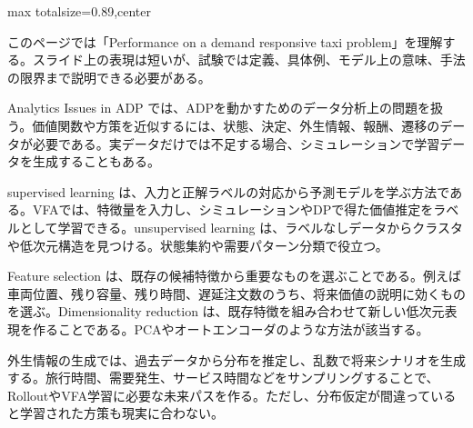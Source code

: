 \begin{minipage}[t]{0.58\textwidth}
\begin{adjustbox}{max totalsize={\textwidth}{0.89\textheight},center}
\begin{minipage}{\textwidth}\scriptsize
{}このページでは「Performance on a demand responsive taxi problem」を理解する。スライド上の表現は短いが、試験では定義、具体例、モデル上の意味、手法の限界まで説明できる必要がある。\par
Analytics Issues in ADP では、ADPを動かすためのデータ分析上の問題を扱う。価値関数や方策を近似するには、状態、決定、外生情報、報酬、遷移のデータが必要である。実データだけでは不足する場合、シミュレーションで学習データを生成することもある。\par
supervised learning は、入力と正解ラベルの対応から予測モデルを学ぶ方法である。VFAでは、特徴量を入力し、シミュレーションやDPで得た価値推定をラベルとして学習できる。unsupervised learning は、ラベルなしデータからクラスタや低次元構造を見つける。状態集約や需要パターン分類で役立つ。\par
Feature selection は、既存の候補特徴から重要なものを選ぶことである。例えば車両位置、残り容量、残り時間、遅延注文数のうち、将来価値の説明に効くものを選ぶ。Dimensionality reduction は、既存特徴を組み合わせて新しい低次元表現を作ることである。PCAやオートエンコーダのような方法が該当する。\par
外生情報の生成では、過去データから分布を推定し、乱数で将来シナリオを生成する。旅行時間、需要発生、サービス時間などをサンプリングすることで、RolloutやVFA学習に必要な未来パスを作る。ただし、分布仮定が間違っていると学習された方策も現実に合わない。\par

\end{minipage}
\end{adjustbox}
\end{minipage}
